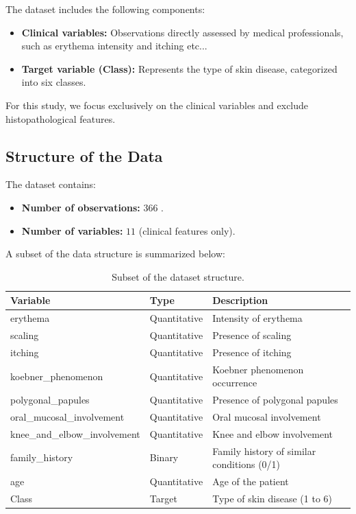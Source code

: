 \documentclass[a4paper,12pt]{article}
\begin{document}
The dataset includes the following components:
\begin{itemize}
    \item \textbf{Clinical variables:} Observations directly assessed by medical professionals, such as erythema intensity and itching etc...
    \item \textbf{Target variable (Class):} Represents the type of skin disease, categorized into six classes.
\end{itemize}

For this study, we focus exclusively on the clinical variables and exclude histopathological features.

\subsection{Structure of the Data}
The dataset contains:
\begin{itemize}
    \item \textbf{Number of observations:} $366$ .
    \item \textbf{Number of variables:} $11$ (clinical features only).
\end{itemize}

A subset of the data structure is summarized below:

\begin{table}[h!]
\centering
\begin{tabular}{lll}
\toprule
\textbf{Variable} & \textbf{Type} & \textbf{Description} \\
\midrule
erythema          & Quantitative  & Intensity of erythema \\
scaling           & Quantitative  & Presence of scaling \\
itching           & Quantitative  & Presence of itching \\
koebner\_phenomenon & Quantitative & Koebner phenomenon occurrence \\
polygonal\_papules & Quantitative & Presence of polygonal papules \\
oral\_mucosal\_involvement & Quantitative & Oral mucosal involvement \\
knee\_and\_elbow\_involvement & Quantitative & Knee and elbow involvement \\
family\_history   & Binary        & Family history of similar conditions (0/1) \\
age               & Quantitative  & Age of the patient \\
Class             & Target        & Type of skin disease (1 to 6) \\
\bottomrule
\end{tabular}
\caption{Subset of the dataset structure.}
\end{table}
\end{document}

